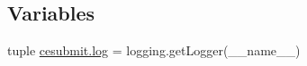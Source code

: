 \subsection*{Variables}
\begin{DoxyCompactItemize}
\item 
tuple \hyperlink{namespacecesubmit_a44a4f98a8c73b6ff9b6b19ea83710150}{cesubmit.\-log} = logging.\-get\-Logger(\-\_\-\-\_\-name\-\_\-\-\_\-)
\end{DoxyCompactItemize}
